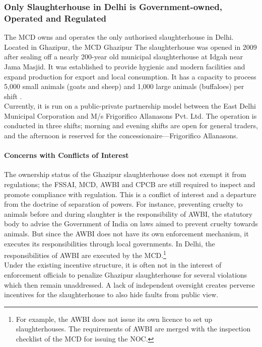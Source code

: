\documentclass[a4paper, 12pt]{article}
\begin{document}
\subsubsection{Only Slaughterhouse in Delhi is Government-owned, Operated and Regulated}

The MCD owns and operates the only authorised slaughterhouse in Delhi. Located in Ghazipur, the MCD Ghazipur The slaughterhouse was opened in 2009 after sealing off a nearly 200-year old municipal slaughterhouse at Idgah near Jama Masjid. It was established to provide hygienic and modern facilities and expand production for export and local consumption. It has a capacity to process 5,000 small animals (goats and sheep) and 1,000 large animals (buffaloes) per shift \parencite{bhardwajnews}.\\

Currently, it is run on a public-private partnership model between the East Delhi Municipal Corporation and M/s Frigorifico Allanasons Pvt. Ltd. The operation is conducted in three shifts; morning and evening shifts are open for general traders, and the afternoon is reserved for the concessionaire—Frigorifico Allanasons.

\paragraph{Concerns with Conflicts of Interest}


The ownership status of the Ghazipur slaughterhouse does not exempt it from regulations; the FSSAI, MCD, AWBI and CPCB are still required to inspect and promote compliance with regulation. This is a conflict of interest and a departure from the doctrine of separation of powers. For instance, preventing cruelty to animals before and during slaughter is the responsibility of AWBI, the statutory body to advise the Government of India on laws aimed to prevent cruelty towards animals. But since the AWBI does not have its own enforcement mechanism, it executes its responsibilities through local governments. In Delhi, the responsibilities of AWBI are executed by the MCD.\footnote{ For example, the AWBI does not issue its own licence to set up slaughterhouses. The requirements of AWBI are merged with the inspection checklist of the MCD for issuing the NOC.}\\

Under the existing incentive structure, it is often not in the interest of enforcement officials to penalize Ghazipur slaughterhouse for several violations which then remain unaddressed. A lack of independent oversight creates perverse incentives for the slaughterhouse to also hide faults from public view. \\
\end{document}
